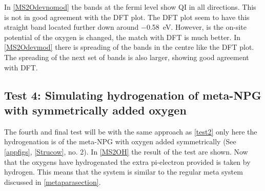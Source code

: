 In \cref{MS2Odevnomod} the bands at the fermi level show QI in all directions. This is not in good agreement with the DFT plot. The DFT plot seem to have this straight band located further down around \SI{-0.58}{\electronvolt}. However, is the on-site potential of the oxygen is changed, the match with DFT is much better. In \cref{MS2Odevmod} there is spreading of the bands in the centre like the DFT plot. The spreading of the next set of bands is also larger, showing good agreement with DFT.
\subsection{Test 4: Simulating hydrogenation of meta-NPG with symmetrically added oxygen}\label{test4}
The fourth and final test will be with the same approach as \cref{test2} only here the hydrogenation is of the meta-NPG with oxygen added symmetrically (See \cref{appfigs}, \cref{Strucow}, no. 2). In \cref{MS2OH} the result of the test are shown. Now that the oxygens have hydrogenated the extra pi-electron provided is taken by hydrogen. This means that the system is similar to the regular meta system discussed in \cref{metaparasection}.
